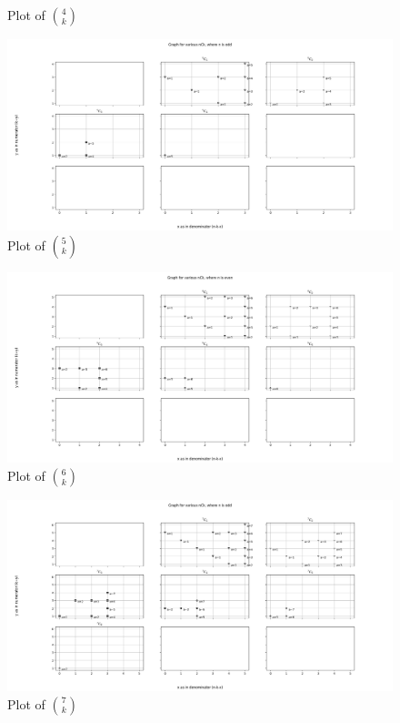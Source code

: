 \documentclass[10pt, twoside]{article}
\newcommand*{\Combination}[2]{\binom{#1}{#2}}%
\begin{document}
\begin{appendices}
\begin{figure}[ph!]
	\caption{Plot of $\Combination{4}{k}$}
	\label{4Ck}
\end{figure}
\begin{figure}[ph!]	
	\includegraphics[width=\linewidth]{5Ck.png}
	\caption{Plot of $\Combination{5}{k}$}
	\label{5Ck}
\end{figure}
\begin{figure}[ph!]	
	\includegraphics[width=\linewidth]{6Ck.png}
	\caption{Plot of $\Combination{6}{k}$}
	\label{6Ck}
\end{figure}
\begin{figure}[ph!]	
	\includegraphics[width=\linewidth]{7Ck.png}
	\caption{Plot of $\Combination{7}{k}$}

\end{figure}
\end{appendices}
\end{document}
